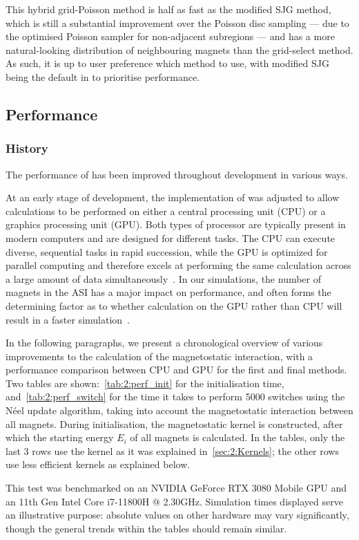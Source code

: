 This hybrid grid-Poisson method is half as fast as the modified SJG method, which is still a substantial improvement over the Poisson disc sampling --- due to the optimised Poisson sampler for non-adjacent subregions --- and has a more natural-looking distribution of neighbouring magnets than the grid-select method.
As such, it is up to user preference which method to use, with modified SJG being the default in \hotspice to prioritise performance.

\subsection{Performance}
\subsubsection{History}
The performance of \hotspice has been improved throughout development in various ways. \par
At an early stage of development, the implementation of \hotspice was adjusted to allow calculations to be performed on either a central processing unit (CPU) or a graphics processing unit (GPU).
Both types of processor are typically present in modern computers and are designed for different tasks.
The CPU can execute diverse, sequential tasks in rapid succession, while the GPU is optimized for parallel computing and therefore excels at performing the same calculation across a large amount of data simultaneously~\cite{owens2008gpu}.
In our simulations, the number of magnets in the ASI has a major impact on performance, and often forms the determining factor as to whether calculation on the GPU rather than CPU will result in a faster simulation~\cite{lee2010debunking}. \par
In the following paragraphs, we present a chronological overview of various improvements to the calculation of the magnetostatic interaction, with a performance comparison between CPU and GPU for the first and final methods.
Two tables are shown:~\cref{tab:2:perf_init} for the initialisation time, and~\cref{tab:2:perf_switch} for the time it takes to perform 5000 switches using the N\'eel update algorithm, taking into account the magnetostatic interaction between all magnets.
During initialisation, the magnetostatic kernel is constructed, after which the starting energy $E_i$ of all magnets is calculated.
In the tables, only the last 3 rows use the kernel as it was explained in~\cref{sec:2:Kernels}; the other rows use less efficient kernels as explained below. \par %
This test was benchmarked on an NVIDIA GeForce RTX 3080 Mobile GPU and an 11th Gen Intel\textregistered{} Core\texttrademark{} i7-11800H @ 2.30GHz.
Simulation times displayed serve an illustrative purpose: absolute values on other hardware may vary significantly, though the general trends within the tables should remain similar.


